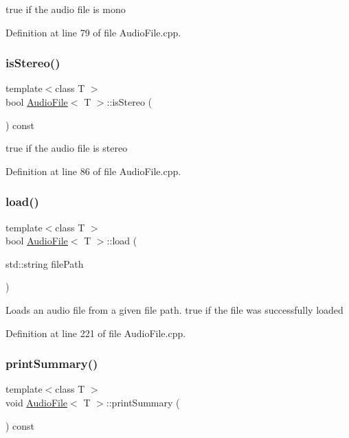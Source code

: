 true if the audio file is mono 

Definition at line 79 of file Audio\+File.\+cpp.

\mbox{\label{classAudioFile_a380a188d95f8f23b7622dfe222a7e8f6}} 
\subsubsection{\texorpdfstring{is\+Stereo()}{isStereo()}}
{\footnotesize\ttfamily template$<$class T $>$ \\
bool \hyperlink{classAudioFile}{Audio\+File}$<$ T $>$\+::is\+Stereo (\begin{DoxyParamCaption}{ }\end{DoxyParamCaption}) const}

true if the audio file is stereo 

Definition at line 86 of file Audio\+File.\+cpp.

\mbox{\label{classAudioFile_a0ff16123b519a4665e9f3e7d341f0a26}} 
\subsubsection{\texorpdfstring{load()}{load()}}
{\footnotesize\ttfamily template$<$class T $>$ \\
bool \hyperlink{classAudioFile}{Audio\+File}$<$ T $>$\+::load (\begin{DoxyParamCaption}\item[{std\+::string}]{file\+Path }\end{DoxyParamCaption})}

Loads an audio file from a given file path.  true if the file was successfully loaded 

Definition at line 221 of file Audio\+File.\+cpp.

\mbox{\label{classAudioFile_a7b88c68133a9ac92149c58499e026360}} 
\subsubsection{\texorpdfstring{print\+Summary()}{printSummary()}}
{\footnotesize\ttfamily template$<$class T $>$ \\
void \hyperlink{classAudioFile}{Audio\+File}$<$ T $>$\+::print\+Summary (\begin{DoxyParamCaption}{ }\end{DoxyParamCaption}) const}

